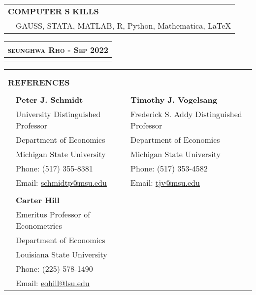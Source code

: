 \documentclass[10pt]{article}
\begin{document}
\begin{center}
\begin{tabular}{llllr}
\multicolumn{5}{l}{{\Large \textbf{C}}\textbf{OMPUTER} {\Large \textbf{S}}%
\textbf{KILLS}} \vspace{0.1cm} \\
&\multicolumn{4}{l}{GAUSS, STATA, MATLAB, R, Python, Mathematica, \LaTeX}\\
\end{tabular}
\clearpage
\begin{tabular}{llllr}
\multicolumn{5}{r}{\textsc{seunghwa Rho - Sep 2022}} \\ \hline
\multicolumn{5}{p{500pt}}{}
\end{tabular}
%


\begin{tabular}{llllr}
\multicolumn{5}{l}{}\\\\
\multicolumn{5}{l}{{\Large \textbf{R}}\textbf{EFERENCES}}\\
\multicolumn{1}{p{20pt}}{}&\multicolumn{1}{p{130pt}}{}&\multicolumn{1}{p{70pt}}{}&\multicolumn{1}{p{130pt}}{}&\multicolumn{1}{p{110pt}}{}\\
\multicolumn{1}{p{10pt}}{}&\multicolumn{2}{l}{\textbf{Peter J. Schmidt}} & \multicolumn{2}{l}{\textbf{Timothy J. Vogelsang}} \\
&\multicolumn{2}{l}{University Distinguished Professor} &\multicolumn{2}{l}{Frederick S. Addy Distinguished Professor} \\
&\multicolumn{2}{l}{Department of Economics} &\multicolumn{2}{l}{Department of Economics} \\
&\multicolumn{2}{l}{Michigan State University} &\multicolumn{2}{l}{Michigan State University}\\
&\multicolumn{2}{l}{Phone: (517) 355-8381}&\multicolumn{2}{l}{Phone: (517) 353-4582} \\
&\multicolumn{2}{l}{Email:  \href{mailto:schmidtp@msu.edu}{schmidtp@msu.edu}}&\multicolumn{2}{l}{Email: \href{mailto:tjv@msu.edu}{tjv@msu.edu}}\\ 
\multicolumn{5}{l}{}\\
& \multicolumn{2}{l}{\textbf{Carter Hill}}&\multicolumn{2}{l}{}\\
&\multicolumn{2}{l}{Emeritus Professor of Econometrics}&\multicolumn{2}{l}{}\\
& \multicolumn{2}{l}{Department of Economics}&\multicolumn{2}{l}{}\\
&\multicolumn{2}{l}{Louisiana State University}&\multicolumn{2}{l}{}\\
&\multicolumn{2}{l}{Phone: (225) 578-1490}&\multicolumn{2}{l}{}\\
&\multicolumn{2}{l}{Email:  \href{mailto:eohill@lsu.edu}{eohill@lsu.edu}}&\multicolumn{2}{l}{}
\end{tabular}

\end{center}
\end{document}
